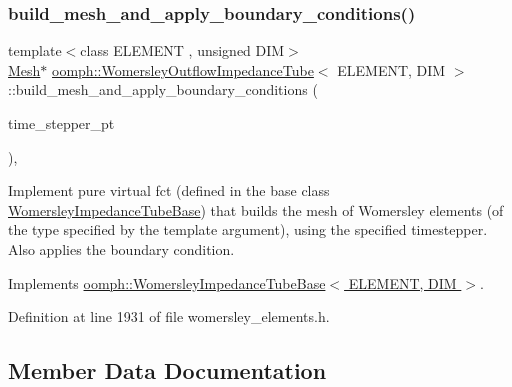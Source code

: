 \subsubsection{\texorpdfstring{build\+\_\+mesh\+\_\+and\+\_\+apply\+\_\+boundary\+\_\+conditions()}{build\_mesh\_and\_apply\_boundary\_conditions()}}
{\footnotesize\ttfamily template$<$class E\+L\+E\+M\+E\+NT , unsigned D\+IM$>$ \\
\hyperlink{classoomph_1_1Mesh}{Mesh}$\ast$ \hyperlink{classoomph_1_1WomersleyOutflowImpedanceTube}{oomph\+::\+Womersley\+Outflow\+Impedance\+Tube}$<$ E\+L\+E\+M\+E\+NT, D\+IM $>$\+::build\+\_\+mesh\+\_\+and\+\_\+apply\+\_\+boundary\+\_\+conditions (\begin{DoxyParamCaption}\item[{\hyperlink{classoomph_1_1TimeStepper}{Time\+Stepper} $\ast$}]{time\+\_\+stepper\+\_\+pt }\end{DoxyParamCaption})\hspace{0.3cm}{\ttfamily [inline]}, {\ttfamily [virtual]}}



Implement pure virtual fct (defined in the base class \hyperlink{classoomph_1_1WomersleyImpedanceTubeBase}{Womersley\+Impedance\+Tube\+Base}) that builds the mesh of Womersley elements (of the type specified by the template argument), using the specified timestepper. Also applies the boundary condition. 



Implements \hyperlink{classoomph_1_1WomersleyImpedanceTubeBase_afbe4fd4a9e8275b010ea210a9f8b1fee}{oomph\+::\+Womersley\+Impedance\+Tube\+Base$<$ E\+L\+E\+M\+E\+N\+T, D\+I\+M $>$}.



Definition at line 1931 of file womersley\+\_\+elements.\+h.



\subsection{Member Data Documentation}
\mbox{\label{classoomph_1_1WomersleyOutflowImpedanceTube_aaed332bd590c1d300cd796a799ae9db8}} 
